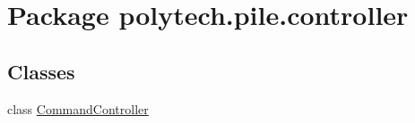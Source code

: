 \hypertarget{namespacepolytech_1_1pile_1_1controller}{}\section{Package polytech.\+pile.\+controller}
\label{namespacepolytech_1_1pile_1_1controller}
\subsection*{Classes}
\begin{DoxyCompactItemize}
\item 
class \hyperlink{classpolytech_1_1pile_1_1controller_1_1_command_controller}{Command\+Controller}
\end{DoxyCompactItemize}
